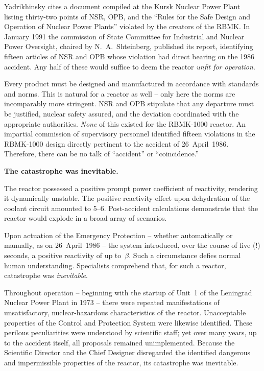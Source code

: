 \documentclass[openright]{bookest}
\begin{document}
Yadrikhinsky cites a document compiled at the Kursk Nuclear Power Plant listing thirty-two points of NSR, OPB, and the ``Rules for the Safe Design and Operation of Nuclear Power Plants'' violated by the creators of the RBMK. In January 1991 the commission of State Committee for Industrial and Nuclear Power Oversight, chaired by N.~A.~Shteinberg, published its report, identifying fifteen articles of NSR and OPB whose violation had direct bearing on the 1986 accident. Any half of these would suffice to deem the reactor \textit{unfit for operation}.

Every product must be designed and manufactured in accordance with standards and norms. This is natural for a reactor as well -- only here the norms are incomparably more stringent. NSR and OPB stipulate that any departure must be justified, nuclear safety assured, and the deviation coordinated with the appropriate authorities. \textit{None} of this existed for the RBMK-1000 reactor. An impartial commission of supervisory personnel identified fifteen violations in the RBMK-1000 design directly pertinent to the accident of 26~April~1986. Therefore, there can be no talk of ``accident'' or ``coincidence.''

\textbf{The catastrophe was inevitable.}

The reactor possessed a positive prompt power coefficient of reactivity, rendering it dynamically unstable. The positive reactivity effect upon dehydration of the coolant circuit amounted to \qtyrange[range-phrase=\text{--}]{5}{6}{\beta}. Post-accident calculations demonstrate that the reactor would explode in a broad array of scenarios.

Upon actuation of the Emergency Protection -- whether automatically or manually, as on 26~April~1986 -- the system introduced, over the course of five (!) seconds, a positive reactivity of up to~$\beta$. Such a circumstance defies normal human understanding. Specialists comprehend that, for such a reactor, catastrophe was \textit{inevitable}.

Throughout operation -- beginning with the startup of Unit~1 of the Leningrad Nuclear Power Plant in 1973 -- there were repeated manifestations of unsatisfactory, nuclear-hazardous characteristics of the reactor. Unacceptable properties of the Control and Protection System were likewise identified. These perilous peculiarities were understood by scientific staff; yet over many years, up to the accident itself, all proposals remained unimplemented. Because the Scientific Director and the Chief Designer disregarded the identified dangerous and impermissible properties of the reactor, its catastrophe was inevitable.
\end{document}
